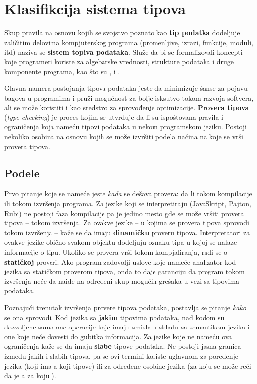 \section{Klasifikcija sistema tipova}

Skup pravila na osnovu kojih se svojstvo poznato kao \textbf{tip podatka} dodeljuje zaličitim delovima kompjuterskog programa (promenljive, izrazi, funkcije, moduli, itd) naziva se \textbf{sistem topiva podataka}.
Služe da bi se formalizovali koncepti koje programeri koriste za algebarske vrednosti, strukture podataka i druge komponente programa, kao što su ,  i .

Glavna namera postojanja tipova podataka jeste da minimizuje šanse za pojavu bagova u programima i pruži mogućnost za bolje isksutvo tokom razvoja softvera, ali se može koristiti i kao sredstvo za sprovođenje optimizacije.
\textbf{Provera tipova} (\textsl{type checking}) je proces kojim se utvrđuje da li su ispoštovana pravila i ograničenja koja nameću tipovi podataka u nekom programskom jeziku.
Postoji nekoliko osobina na osnovu kojih se može izvršiti podela načina na koje se vrši provera tipova.

\subsection{Podele}

Prvo pitanje koje se nameće jeste \textit{kada} se dešava provera: da li tokom kompilacije ili tokom izvršenja programa.
Za jezike koji se interpretiraju (JavaSkript, Pajton, Rubi) ne postoji faza kompilacije pa je jedino mesto gde se može vršiti provera tipova -- tokom izvršenja.
Za ovakve jezike -- u kojima se provera tipova sprovodi tokom izvršenja -- kaže se da imaju \textbf{dinamičku} proveru tipova.
Interpretatori za ovakve jezike obično svakom objektu dodeljuju oznaku tipa u kojoj se nalaze informacije o tipu.
Ukoliko se provera vrši tokom kompjaliranja, radi se o \textbf{statičkoj} proveri.
Ako program zadovolji uslove koje nameće analizator kod jezika sa statičkom proverom tipova, onda to daje garanciju da program tokom izvršenja neće da naiđe na određeni skup mogućih grešaka u vezi sa tipovima podataka.

Poznajući trenutak izvršenja provere tipova podataka, postavlja se pitanje \textit{kako} se ona sprovodi.
Kod jezika sa \textbf{jakim} tipovima podataka, nad kodom su dozvoljene samo one operacije koje imaju smisla u skladu sa semantikom jezika i one koje neće dovesti do gubitka informacija.
Za jezike koje ne nameću ova ograničenja kaže se da imaju \textbf{slabe} tipove podataka.
Ne postoji jasna granica između jakih i slabih tipova, pa se ovi termini koriste uglavnom za poređenje jezika (koji ima  a koji  tipove) ili za određene osobine jezika (za koju se može reći da je  a za koju ).

